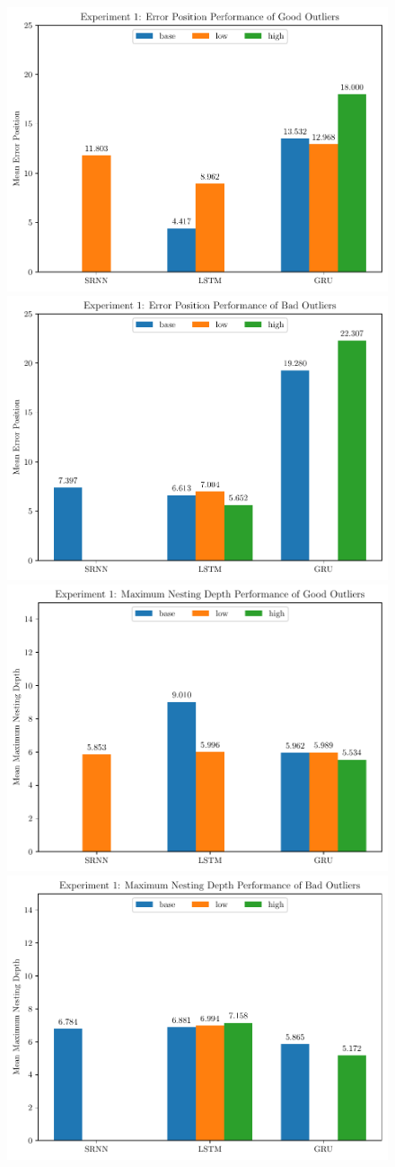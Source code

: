 \begin{figure}[!tbp]
	\begin{minipage}{\textwidth}
     \centering
     \includegraphics[width=.45\textwidth]{fig/LRD_error_pos_good}\quad
     \includegraphics[width=.45\textwidth]{fig/LRD_error_pos_bad}\\
     \includegraphics[width=.45\textwidth]{fig/LRD_max_valid_nesting_depth_good}\quad
     \includegraphics[width=.45\textwidth]{fig/LRD_max_valid_nesting_depth_bad}
     \label{fig:FP_Prop_LRD}
   \end{minipage}\\[1em]
   \begin{minipage}{\textwidth}

\end{minipage}
\end{figure}
